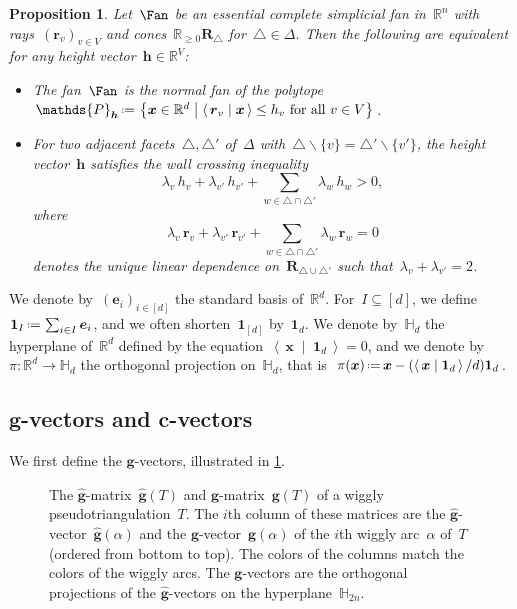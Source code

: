 \documentclass{amsart}
\newtheorem{proposition}[theorem]{Proposition}
\theoremstyle{definition}
\newcommand{\R}{\mathbb{R}} %
\newcommand{\HH}{\mathbb{H}} %
\renewcommand{\b}[1]{{\boldsymbol{#1}}} %
\newcommand{\set}[2]{\left\{ #1 \;\middle|\; #2 \right\}} %
\newcommand{\ssm}{\smallsetminus} %
\newcommand{\dotprod}[2]{\left\langle \, #1 \; \middle| \; #2 \, \right\rangle} %
\newcommand{\one}{\b{1}} %
\newcommand{\eqdef}{\mbox{\,\raisebox{0.2ex}{\scriptsize\ensuremath{\mathrm:}}\ensuremath{=}\,}} %
\newcommand{\darkblue}{\color{darkblue}} %
\newcommand{\defn}[1]{\textsl{\darkblue #1}} %
\newcommand{\polytope}[1]{\mathds{#1}} %
\begin{document}
\begin{proposition}
\label{prop:characterizationPolytopalFan}
Let~$\Fan$ be an essential complete simplicial fan in~$\R^n$ with rays~$(\b{r}_v)_{v \in V}$ and cones~$\R_{\ge 0} \b{R}_\triangle$ for~$\triangle \in \Delta$.
Then the following are equivalent for any height vector~$\b{h} \in \R^V$:
\begin{itemize}
\item The fan~$\Fan$ is the normal fan of the polytope~$\polytope{P}_{\b{h}} \eqdef \set{\b{x} \in \R^d}{\dotprod{\b{r}_v}{\b{x}} \le h_v \text{ for all } v \in V}$.
\item For two adjacent facets~$\triangle, \triangle'$ of~$\Delta$ with~$\triangle \ssm \{v\} = \triangle' \ssm \{v'\}$, the height vector~$\b{h}$ satisfies the \defn{wall crossing inequality}
\[
\lambda_v \, h_v + \lambda_{v'} \, h_{v'} + \sum_{w \in \triangle \cap \triangle'} \lambda_w \, h_w > 0,
\]
where
\[
\lambda_v \, \b{r}_v + \lambda_{v'} \, \b{r}_{v'} + \sum_{w \in \triangle \cap \triangle'} \lambda_w \, \b{r}_w = 0
\]
denotes the unique linear dependence on~$\b{R}_{\triangle \cup \triangle'}$ such that~$\lambda_v + \lambda_{v'} = 2$.
\end{itemize}
\end{proposition}

\pagebreak
We denote by~$(\b{e}_i)_{i \in [d]}$ the standard basis of~$\R^d$.
For~$I \subseteq [d]$, we define~$\one_I \eqdef \sum_{i \in I} \b{e}_i$, and we often shorten~$\one_{[d]}$ by~$\one_d$.
We denote by~$\HH_d$ the hyperplane of~$\R^d$ defined by the equation~$\dotprod{\b{x}}{\one_d} = 0$, and we denote by~$\pi : \R^d \to \HH_d$ the orthogonal projection on~$\HH_d$, that is~$\pi(\b{x}) \eqdef \b{x} - (\dotprod{\b{x}}{\one_d} / d) \one_d$.


\subsection{$\b{g}$-vectors and $\b{c}$-vectors}
\label{subsec:gcvectors}

We first define the $\b{g}$-vectors, illustrated in \cref{fig:ggMatrices}.
%
\begin{figure}
\centerline{ \quad }
\caption{The $\hat{\b{g}}$-matrix~$\hat{\b{g}}(T)$ and $\b{g}$-matrix~$\b{g}(T)$ of a wiggly pseudotriangulation~$T$. The $i$th column of these matrices are the $\hat{\b{g}}$-vector~$\hat{\b{g}}(\alpha)$ and the $\b{g}$-vector~$\b{g}(\alpha)$ of the $i$th wiggly arc~$\alpha$ of~$T$ (ordered from bottom to top). The colors of the columns match the colors of the wiggly arcs. The $\b{g}$-vectors are the orthogonal projections of the $\hat{\b{g}}$-vectors on the hyperplane~$\HH_{2n}$.}
\label{fig:ggMatrices}
\end{figure}
\end{document}
